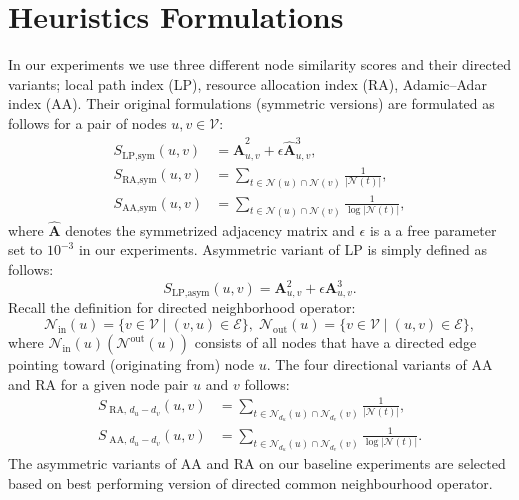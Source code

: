 \documentclass{article}
\begin{document}
\section{Heuristics Formulations}\label{app:heuristics}
In our experiments we use three different node similarity scores and their directed variants;  local path index (LP), resource allocation index (RA), Adamic–Adar index (AA). Their original formulations (symmetric versions) are formulated as follows for a pair of nodes $u, v \in \mathcal{V}$:
\begin{align}
    S_{\operatorname{LP, sym}}(u, v) &= \mathbf{\hat{A}}^2_{u, v} + \epsilon \mathbf{\hat{A}}^3_{u, v}, \\
    S_{\operatorname{RA, sym}}(u, v) &= \sum_{t \in \mathcal{N}(u) \cap \mathcal{N}(v)}\frac{1}{|\mathcal{N}(t)|}, \\
    S_{\operatorname{AA, sym}}(u, v) &= \sum_{t \in \mathcal{N}(u) \cap \mathcal{N}(v)}\frac{1}{\log{|\mathcal{N}(t)|}},
\end{align}
where $\mathbf{\hat{A}}$ denotes the symmetrized adjacency matrix and $\epsilon$ is a a free parameter set to $10^{-3}$ in our experiments. Asymmetric variant of LP is simply defined as follows:
\begin{equation}
    S_{\operatorname{LP, asym}}(u, v) = \mathbf{A}^2_{u, v} + \epsilon \mathbf{A}^3_{u, v}.
\end{equation}
Recall the definition for directed neighborhood operator:
\begin{equation}
    \mathcal{N}_{\operatorname{in}}(u) = \{v \in \mathcal{V} \mid (v, u) \in \mathcal{E}\}, \;
    \mathcal{N}_{\operatorname{out}}(u) = \{v \in \mathcal{V} \mid (u, v) \in \mathcal{E}\},
\end{equation}
where $\mathcal{N}_{\operatorname{in}}(u)(\mathcal{N}^{\operatorname{out}}(u))$ consists of all nodes that have a directed edge pointing toward (originating from) node $u$. The four directional variants of  AA and RA  for a given node pair $u$ and $v$ follows:
\begin{align}
    S_{\operatorname{RA,} d_u - d_v}(u, v) &= \sum_{t \in \mathcal{N}_{d_u}(u) \cap \mathcal{N}_{d_v}(v)}\frac{1}{|\mathcal{N}(t)|}, \\
    S_{\operatorname{AA,} d_u - d_v}(u, v) &= \sum_{t \in \mathcal{N}_{d_u}(u) \cap \mathcal{N}_{d_v}(v)}\frac{1}{\log|\mathcal{N}(t)|}.
\end{align}
The asymmetric variants of AA and RA on our baseline experiments are selected based on best performing version of directed common neighbourhood operator.
\end{document}
